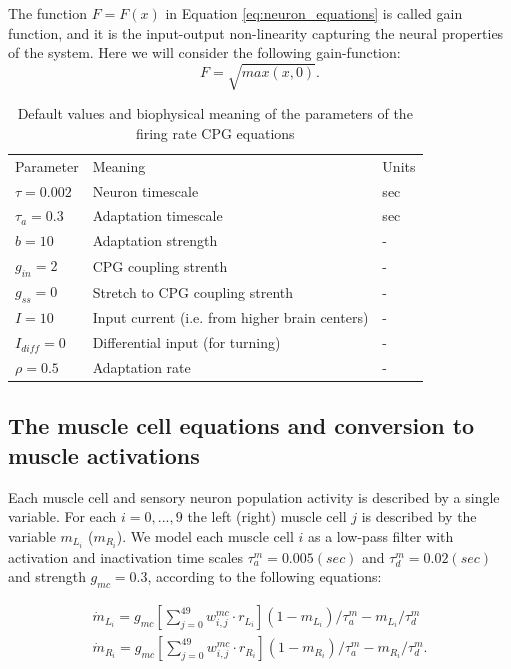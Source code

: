 \documentclass{cmc}
\begin{document}
The function $F=F(x)$ in Equation \ref{eq:neuron_equations} is called gain function, and it is the input-output non-linearity capturing the neural properties of the system. Here we will consider the following gain-function:
\begin{equation}
F=\sqrt{max(x,0)}.
\label{SReLu_eq}
\end{equation}


\begin{table}[h!]
\centering
\begin{tabular}{ l l l }
 Parameter & Meaning & Units \\
 $\tau=0.002$ & Neuron timescale & sec\\
 $\tau_a=0.3$ & Adaptation timescale & sec \\
 $b=10$ & Adaptation strength & - \\
 $g_{in}=2$ & CPG coupling strenth & -\\
 $g_{ss}=0$ & Stretch to CPG coupling strenth & -\\
 $I=10$ & Input current (i.e. from higher brain centers) & - \\
 $I_{diff}=0$ & Differential input (for turning) & - \\
 $\rho=0.5$ & Adaptation rate & -
\end{tabular}
\caption{Default values and biophysical meaning of the parameters of the firing rate CPG equations}
\label{table_par_CPG}
\end{table}


\subsection*{The muscle cell equations and conversion to muscle activations}

Each muscle cell and sensory neuron population activity is described by a single variable. For each $i=0,...,9$ the left (right) muscle cell $j$ is described by the variable $m_{L_i}$ ($m_{R_i}$). We model each muscle cell $i$ as a low-pass filter with activation and inactivation time scales $\tau^m_a=0.005 (sec)$ and $\tau^m_d=0.02 (sec)$ and strength $g_{mc}=0.3$, according to the following equations:

\begin{equation}
    \begin{array}{lcl}
	\dot{m}_{L_i} = g_{mc} \left[ \sum_{j=0}^{49} w^{mc}_{i,j} \cdot r_{L_i} \right] (1-m_{L_i}) / \tau^m_a - m_{L_i}/ \tau^m_d\\
	\dot{m}_{R_i} = g_{mc} \left[ \sum_{j=0}^{49} w^{mc}_{i,j} \cdot r_{R_i} \right] (1-m_{R_i}) / \tau^m_a - m_{R_i}/ \tau^m_d.
    \end{array}
	\label{eq:muscle_equations}
\end{equation}
\end{document}
